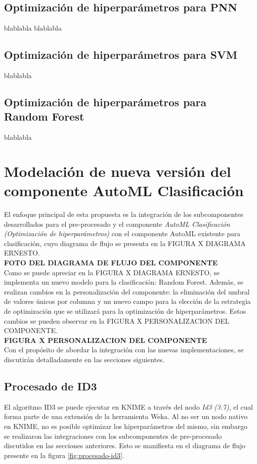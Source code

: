 \subsection{Optimización de hiperparámetros para PNN}
blablabla
blablabla

\subsection{Optimización de hiperparámetros para SVM}

blablabla

\subsection{Optimización de hiperparámetros para Random Forest}
blablabla



\section{Modelación de nueva versión del componente AutoML Clasificación}
El enfoque principal de esta propuesta es la integración de los subcomponentes desarrollados para el pre-procesado y el componente \textit{AutoML Clasificación (Optimización de hiperparámetros)} con el componente AutoML existente para clasificación, cuyo diagrama de flujo se presenta en la FIGURA X DIAGRAMA ERNESTO. \\

\textbf{FOTO DEL DIAGRAMA DE FLUJO DEL COMPONENTE} \\

Como se puede apreciar en la FIGURA X DIAGRAMA ERNESTO, se implementa un nuevo modelo para la clasificación: Random Forest. Además, se realizan cambios en la personalización del componente: la eliminación del umbral de valores únicos por columna y un nuevo campo para la elección de la estrategia de optimización que se utilizará para la optimización de hiperparámetros. Estos cambios se pueden observar en la FIGURA X PERSONALIZACION DEL COMPONENTE. \\

\textbf{ FIGURA X PERSONALIZACION DEL COMPONENTE} \\

Con el propósito de abordar la integración con las nuevas implementaciones, se discutirán detalladamente en las secciones siguientes.

\subsection{Procesado de ID3}
El algoritmo ID3 se puede ejecutar en KNIME a través del nodo \textit{Id3 (3.7)}, el cual forma parte de una extensión de la herramienta Weka. Al no ser un nodo nativo en KNIME, no es posible optimizar los hiperparámetros del mismo, sin embargo se realizaron las integraciones con los subcomponentes de pre-procesado discutidos en las secciones anteriores. Esto se manifiesta en el diagrama de flujo presente en la figura \ref{fig:procesado-id3}.

